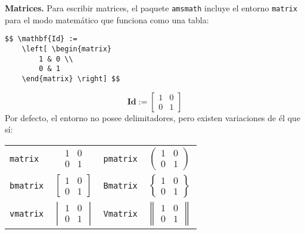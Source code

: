 \textbf{Matrices.} Para escribir matrices, el paquete \texttt{amsmath} incluye el entorno \texttt{matrix} para el modo matemático que funciona como una tabla:
\begin{lstlisting}
$$ \mathbf{Id} :=
	\left[ \begin{matrix}
		1 & 0 \\
		0 & 1
	\end{matrix} \right] $$
\end{lstlisting}
$$ \mathbf{Id} :=
	\left[ \begin{matrix}
		1 & 0 \\
		0 & 1
	\end{matrix} \right] $$
Por defecto, el entorno no posee delimitadores, pero existen variaciones de él que sí:
\begin{center}
	\begin{tabular}{lc|lc}
		\hline \hline
		\texttt{matrix}  & {$\begin{matrix}  1 & 0 \\ 0 & 1 \end{matrix}$}  & \texttt{pmatrix} & {$\begin{pmatrix} 1 & 0 \\ 0 & 1 \end{pmatrix}$} \\[1.2em]
		\texttt{bmatrix} & {$\begin{bmatrix} 1 & 0 \\ 0 & 1 \end{bmatrix}$} & \texttt{Bmatrix} & {$\begin{Bmatrix} 1 & 0 \\ 0 & 1 \end{Bmatrix}$} \\[1.2em]
		\texttt{vmatrix} & {$\begin{vmatrix} 1 & 0 \\ 0 & 1 \end{vmatrix}$} & \texttt{Vmatrix} & {$\begin{Vmatrix} 1 & 0 \\ 0 & 1 \end{Vmatrix}$} \\
		\hline \hline
	\end{tabular}
\end{center}

